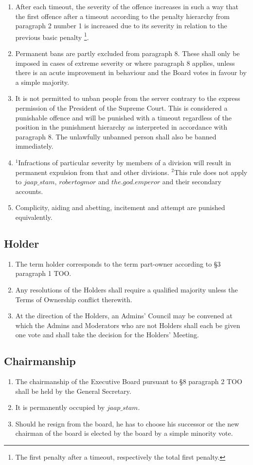 \documentclass{article}
\begin{document}
\begin{enumerate}[(1)]
    \item After each timeout, the severity of the offence increases in such a way that the first offence after a timeout according to the penalty hierarchy from paragraph 2 number 1  is increased due to its severity in relation to the previous basic penalty \footnote{The first penalty after a timeout, respectively the total first penalty.}.
	\item Permanent bans are partly excluded from paragraph 8. These shall only be imposed in cases of extreme severity or where paragraph 8 applies, unless there is an acute improvement in behaviour and the Board votes in favour by a simple majority.
	\item It is not permitted to unban people from the server contrary to the express permission of the President of the Supreme Court. This is considered a punishable offence and will be punished with a timeout regardless of the position in the punishment hierarchy as interpreted in accordance with paragraph 8. The unlawfully unbanned person shall also be banned immediately.
	\item $^{1}$Infractions of particular severity by members of a division will result in permanent expulsion from that and other divisions. $^{2}$This rule does not apply to $jaap\_stam$, $robertogmor$ and $the.god.emperor$ and their secondary accounts.
	\item Complicity, aiding and abetting, incitement and attempt are punished equivalently.
\end{enumerate}

\subsection{Holder}
\begin{enumerate}[(1)]
	\item The term holder corresponds to the term part-owner according to §3 paragraph 1 TOO.
	\item Any resolutions of the Holders shall require a qualified majority unless the Terms of Ownership conflict therewith.
	\item At the direction of the Holders, an Admins' Council may be convened at which the Admins and Moderators who are not Holders shall each be given one vote and shall take the decision for the Holders' Meeting.
\end{enumerate}

\subsection{Chairmanship}
\begin{enumerate}[(1)]
	\item The chairmanship of the Executive Board pursuant to §8 paragraph 2 TOO shall be held by the General Secretary.
	\item It is permanently occupied by $jaap\_stam$.
	\item Should he resign from the board, he has to choose his successor or the new chairman of the board is elected by the board by a simple minority vote.
\end{enumerate}
\end{document}
